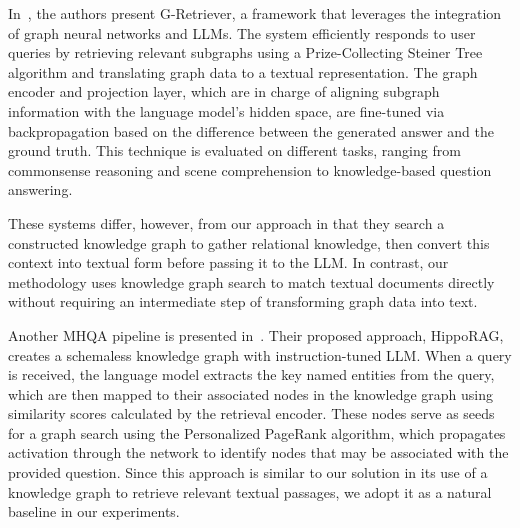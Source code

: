 \documentclass{article}
\begin{document}
In~\cite{g-retriever}, the authors present G-Retriever, a framework that leverages the integration of graph neural networks and LLMs. The system efficiently responds to user queries by retrieving relevant subgraphs using a Prize-Collecting Steiner Tree algorithm and translating graph data to a textual representation. The graph encoder and projection layer, which are in charge of aligning subgraph information with the language model's hidden space, are fine-tuned via backpropagation based on the difference between the generated answer and the ground truth. This technique is evaluated on different tasks, ranging from commonsense reasoning and scene comprehension to knowledge-based question answering.

These systems differ, however, from our approach in that they search a constructed knowledge graph to gather relational knowledge, then convert this context into textual form before passing it to the LLM. In contrast, our methodology uses knowledge graph search to match textual documents directly without requiring an intermediate step of transforming graph data into text. 

Another MHQA pipeline is presented in~\cite{jimenez2024hipporag, gutierrez2025rag}. Their proposed approach, HippoRAG, creates a schemaless knowledge graph with instruction-tuned LLM. When a query is received, the language model extracts the key named entities from the query, which are then mapped to their associated nodes in the knowledge graph using similarity scores calculated by the retrieval encoder. These nodes serve as seeds for a graph search using the Personalized PageRank algorithm, which propagates activation through the network to identify nodes that may be associated with the provided question. Since this approach is similar to our solution in its use of a knowledge graph to retrieve relevant textual passages, we adopt it as a natural baseline in our experiments.
\end{document}
